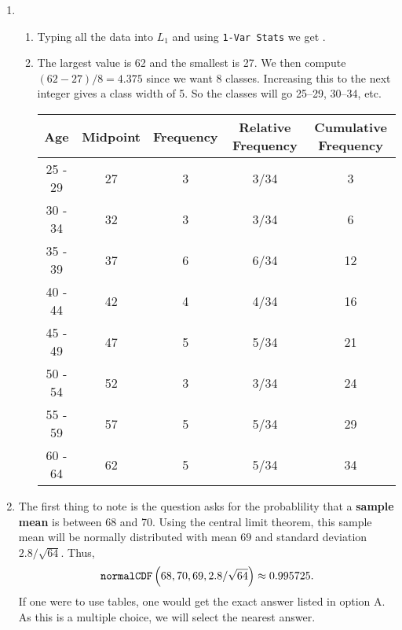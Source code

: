 \documentclass{article}
\newcommand{\answer}[1]{{\color{red}{\large \textbf{#1}}}}
\begin{document}
\begin{enumerate}
\item \begin{enumerate}
        \item Typing all the data into $L_1$ and using \texttt{1-Var Stats} we get \answer{$S_x = 11.0721$}.
        \item The largest value is 62 and the smallest is 27. We then compute $(62-27)/8=4.375$ since we want 8 classes. Increasing this to the next integer gives a class width of 5. So the classes will go 25--29, 30--34, etc.
        \begin{center}
        \begin{tabular}{c|c|c|c|c}
        Age & Midpoint & Frequency & Relative Frequency & Cumulative Frequency \\
        \hline 
        25 - 29 & 27 & 3 & 3/34 & 3 \\
        30 - 34 & 32 & 3 & 3/34 & 6 \\
        35 - 39 & 37 & 6 & 6/34 & 12 \\
        40 - 44 & 42 & 4 & 4/34 & 16 \\
        45 - 49 & 47 & 5 & 5/34 & 21 \\
        50 - 54 & 52 & 3 & 3/34 & 24 \\
        55 - 59 & 57 & 5 & 5/34 & 29 \\
        60 - 64 & 62 & 5 & 5/34 & 34 \\
        \end{tabular}\end{center}
        
    \end{enumerate}
    
\item \answer{A} The first thing to note is the question asks for the probablility that a \textbf{sample mean} is between 68 and 70. Using the central limit theorem, this sample mean will be normally distributed with mean $69$ and standard deviation $2.8/\sqrt{64}$. Thus,
$$\mbox{\texttt{normalCDF}}\left(68, 70, 69, 2.8/\sqrt{64} \right) \approx 0.995725.$$
If one were to use tables, one would get the exact answer listed in option A. As this is a multiple choice, we will select the nearest answer.

\end{enumerate}
\end{document}
